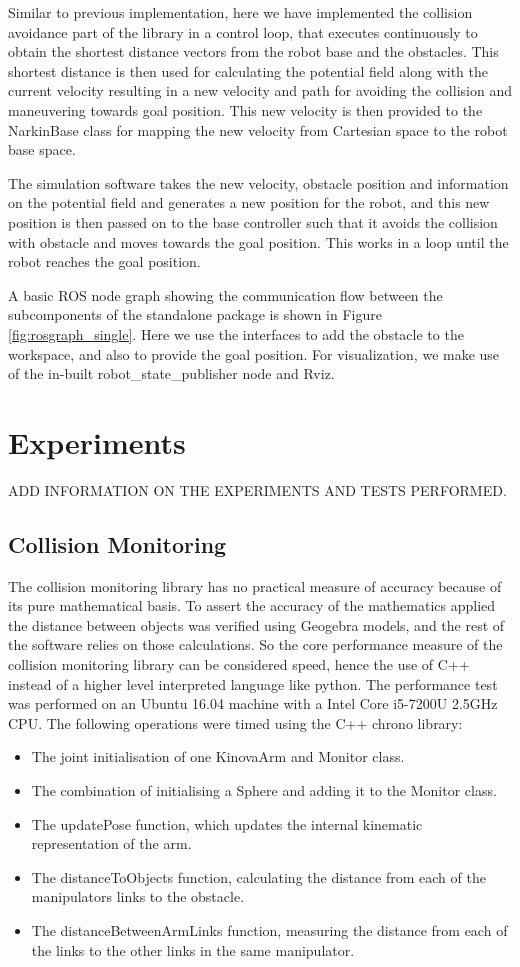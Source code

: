 \documentclass[a4paper, 11.5pt, conference]{ieeeconf}      %
\begin{document}
Similar to previous implementation, here we have implemented the collision avoidance part of the library in a control loop, that executes continuously to obtain the shortest distance vectors from the robot base and the obstacles. This shortest distance is then used for calculating the potential field along with the current velocity resulting in a new velocity and path for avoiding the collision and maneuvering towards goal position. This new velocity is then provided to the NarkinBase class for mapping the new velocity from Cartesian space to the robot base space.

The simulation software takes the new velocity, obstacle position and information on the potential field and generates a new position for the robot, and this new position is then passed on to the base controller such that it avoids the collision with obstacle and moves towards the goal position. This works in a loop until the robot reaches the goal position. 

A basic ROS node graph showing the communication flow between the subcomponents of the standalone package is shown in Figure \ref{fig:rosgraph_single}. Here we use the interfaces to add the obstacle to the workspace, and also to provide the goal position. For visualization, we make use of the in-built robot\_state\_publisher node and Rviz.

\section{Experiments}
ADD INFORMATION ON THE EXPERIMENTS AND TESTS PERFORMED.
\subsection{Collision Monitoring} %
The collision monitoring library has no practical measure of accuracy because of its pure mathematical basis. To assert the accuracy of the mathematics applied the distance between objects was verified using Geogebra models, and the rest of the software relies on those calculations. So the core performance measure of the collision monitoring library can be considered speed, hence the use of C++ instead of a higher level interpreted language like python. The performance test was performed on an Ubuntu 16.04 machine with a Intel Core i5-7200U 2.5GHz CPU. The following operations were timed using the C++ chrono library:
\begin{itemize}
	\item The joint initialisation of one KinovaArm and Monitor class.
	\item The combination of initialising a Sphere and adding it to the Monitor class.
	\item The updatePose function, which updates the internal kinematic representation of the arm.
	\item The distanceToObjects function, calculating the distance from each of the manipulators links to the obstacle.
	\item The distanceBetweenArmLinks function, measuring the distance from each of the links to the other links in the same manipulator.
\end{itemize}
\end{document}
